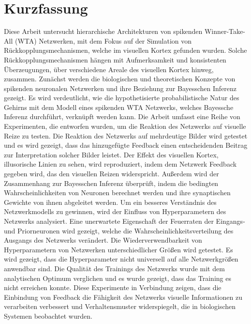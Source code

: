 \section*{Kurzfassung}
\label{cha:abstractGerman}

Diese Arbeit untersucht hierarchische Architekturen von spikenden Winner-Take-All (WTA) Netzwerken, mit dem Fokus auf der Simulation von Rückkopplungsmechanismen, welche im visuellen Kortex gefunden wurden. Solche Rückkopplungsmechanismen hängen mit Aufmerksamkeit und konsistenten Überzeugungen, über verschiedene Areale des visuellen Kortex hinweg, zusammen.
Zunächst werden die biologischen und theoretischen Konzepte von spikenden neuronalen Netzwerken und ihre Beziehung zur Bayesschen Inferenz gezeigt. Es wird verdeutlicht, wie die hypothetisierte probabilistische Natur des Gehirns mit dem Modell eines spikenden WTA Netzwerks, welches Bayessche Inferenz durchführt, verknüpft werden kann.
Die Arbeit umfasst eine Reihe von Experimenten, die entworfen wurden, um die Reaktion des Netzwerks auf visuelle Reize zu testen. Die Reaktion des Netzwerks auf mehrdeutige Bilder wird getestet und es wird gezeigt, dass das hinzugefügte Feedback einen entscheidenden Beitrag zur Interpretation solcher Bilder leistet. Der Effekt des visuellen Kortex, illusorische Linien zu sehen, wird reproduziert, indem dem Netzwerk Feedback gegeben wird, das den visuellen Reizen widerspricht. Außerdem wird der Zusammenhang zur Bayesschen Inferenz überprüft, indem die bedingten Wahrscheinlichkeiten von Neuronen berechnet werden und ihre synaptischen Gewichte von ihnen abgeleitet werden. Um ein besseres Verständnis des Netzwerkmodells zu gewinnen, wird der Einfluss von Hyperparametern des Netzwerks analysiert. Eine unerwartete Eigenschaft der Feuerraten der Eingangs- und Priorneuronen wird gezeigt, welche die Wahrscheinlichkeitsverteilung des Ausgangs des Netzwerks verändert. Die Wiederverwendbarkeit von Hyperparametern von Netzwerken unterschiedlicher Größen wird getestet. Es wird gezeigt, dass die Hyperparameter nicht universell auf alle Netzwerkgrößen anwendbar sind. Die Qualität des Trainings des Netzwerks wurde mit dem analytischen Optimum verglichen und es wurde gezeigt, dass das Training es nicht erreichen konnte. Diese Experimente in Verbindung zeigen, dass die Einbindung von Feedback die Fähigkeit des Netzwerks visuelle Informationen zu verarbeiten verbessert und Verhaltensmuster widerspiegelt, die in biologischen Systemen beobachtet wurden.

